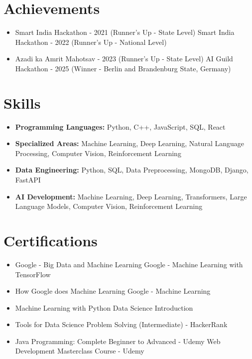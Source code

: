\documentclass[a4paper,10pt]{article}
\begin{document}
\section*{Achievements}
\begin{itemize}
\item Smart India Hackathon - 2021 (Runner's Up - State Level) \hfill Smart India Hackathon - 2022 (Runner's Up - National Level)
\item Azadi ka Amrit Mahotsav - 2023 (Runner's Up - State Level) \hfill AI Guild Hackathon - 2025 (Winner - Berlin and Brandenburg State, Germany)
\end{itemize}

\section*{Skills}
\begin{itemize}
  \item \textbf{Programming Languages:} Python, C++, JavaScript, SQL, React
  \item \textbf{Specialized Areas:} Machine Learning, Deep Learning, Natural Language Processing, Computer Vision, Reinforcement Learning
  \item \textbf{Data Engineering:} Python, SQL, Data Preprocessing, MongoDB, Django, FastAPI
  \item \textbf{AI Development:} Machine Learning, Deep Learning, Transformers, Large Language Models, Computer Vision, Reinforcement Learning
\end{itemize}

\section*{Certifications}
\begin{itemize}
\item Google - Big Data and Machine Learning \hfill Google - Machine Learning with TensorFlow
\item How Google does Machine Learning \hfill Google - Machine Learning
\item Machine Learning with Python \hfill Data Science Introduction
\item Tools for Data Science \hfill Problem Solving (Intermediate) - HackerRank
\item Java Programming: Complete Beginner to Advanced - Udemy \hfill Web Development Masterclass Course - Udemy
\end{itemize}
\end{document}
